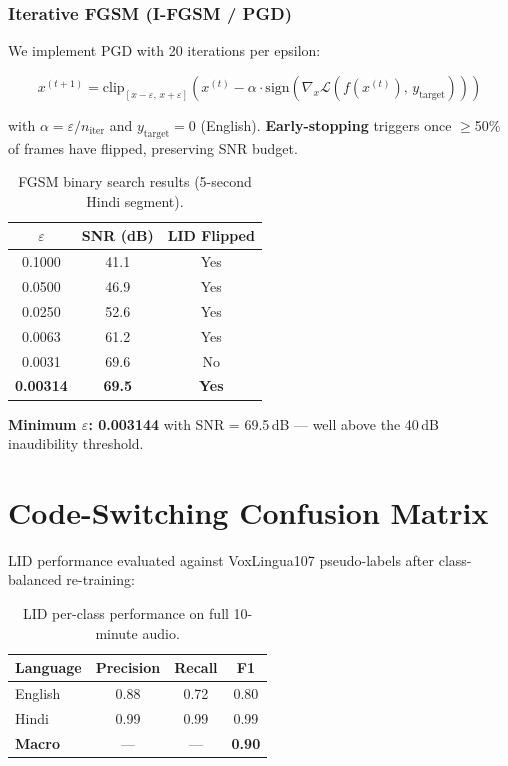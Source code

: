 \documentclass[11pt]{article}
\begin{document}
\subsubsection{Iterative FGSM (I-FGSM / PGD)}

We implement PGD with 20 iterations per epsilon:

\begin{equation}
  x^{(t+1)} = \mathrm{clip}_{[x-\varepsilon,\,x+\varepsilon]}
  \!\left(x^{(t)} - \alpha\cdot\mathrm{sign}\!\left(\nabla_x
  \mathcal{L}(f(x^{(t)}),\,y_{\mathrm{target}})\right)\right)
\end{equation}

with $\alpha = \varepsilon/n_{\mathrm{iter}}$ and $y_{\mathrm{target}}=0$
(English). \textbf{Early-stopping} triggers once $\ge$50\% of frames have
flipped, preserving SNR budget.

\begin{table}[h]
\centering
\caption{FGSM binary search results (5-second Hindi segment).}
\label{tab:fgsm}
\small
\begin{tabular}{ccc}
\toprule
\textbf{$\varepsilon$} & \textbf{SNR (dB)} & \textbf{LID Flipped}\\
\midrule
0.1000  & 41.1 & Yes\\
0.0500  & 46.9 & Yes\\
0.0250  & 52.6 & Yes\\
0.0063  & 61.2 & Yes\\
0.0031  & 69.6 & No\\
\textbf{0.00314} & \textbf{69.5} & \textbf{Yes}\\
\bottomrule
\end{tabular}
\end{table}

\textbf{Minimum $\varepsilon$: 0.003144} with SNR = 69.5\,dB ---
well above the 40\,dB inaudibility threshold.

\section{Code-Switching Confusion Matrix}

LID performance evaluated against VoxLingua107 pseudo-labels after
class-balanced re-training:

\begin{table}[h]
\centering
\caption{LID per-class performance on full 10-minute audio.}
\label{tab:lid}
\small
\begin{tabular}{lccc}
\toprule
\textbf{Language} & \textbf{Precision} & \textbf{Recall} & \textbf{F1}\\
\midrule
English & 0.88 & 0.72 & 0.80\\
Hindi   & 0.99 & 0.99 & 0.99\\
\midrule
\textbf{Macro} & --- & --- & \textbf{0.90}\\
\bottomrule
\end{tabular}
\end{table}
\end{document}
